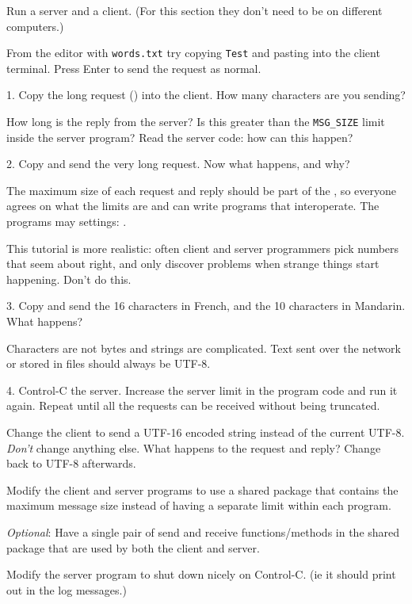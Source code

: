 Run a server and a client. (For this section they don't need to be on different
computers.)

From the editor with \texttt{words.txt} try copying \texttt{Test} and pasting into
the client terminal. Press Enter to send the request as normal.

1. Copy the long request () into the client. How many characters
are you sending?

How long is the reply from the server? Is this greater than the \texttt{MSG\_SIZE}
limit inside the server program? Read the server code: how can this happen?

2. Copy and send the very long request. Now what happens, and why?

\begin{IMPORTANT}
The maximum size of each request and reply should be part of the , so everyone agrees on what the limits are and can write programs that
interoperate. The programs may  settings:  .

This tutorial is more realistic: often client and server programmers pick
numbers that seem about right, and only discover problems when strange things start
happening. Don't do this.
\end{IMPORTANT}

3. Copy and send the 16 characters in French, and the 10 characters in Mandarin.
What happens?

\begin{IMPORTANT}
Characters are not bytes and strings are complicated. Text sent over the network
or stored in files should always be UTF-8.
\end{IMPORTANT}

4. Control-C the server. Increase the server limit in the program code and run it
again. Repeat until all the requests can be received without being truncated.



Change the client  to send a UTF-16 encoded string instead of the
current UTF-8. \emph{Don't} change anything else. What happens to the request and
reply? Change back to UTF-8 afterwards.

Modify the client and server programs to use a shared package that contains the
maximum message size instead of having a separate limit within each program.

\emph{Optional}: Have a single pair of send and receive functions/methods
in the shared package that are used by both the client and server.

Modify the server program to shut down nicely on Control-C. (ie it should print out
 in the log messages.)


\COPYRIGHT


